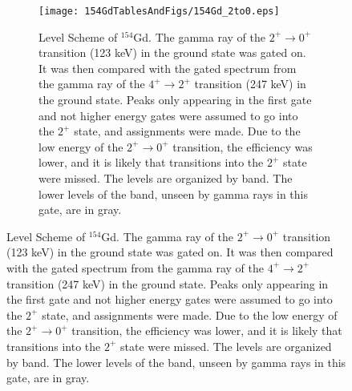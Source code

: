 \begin{landscape}
\begin{figure}[!]
    \centering
    \begin{subfigure}{1.4\textwidth}
    \texttt{[image: 154GdTablesAndFigs/154Gd\_2to0.eps]}
    \caption{\label{fig:154_2to0level}Level Scheme of $^{154}$Gd. The gamma ray of the $2^+\rightarrow0^+$ transition (123 keV) in the ground state was gated on. It was then compared with the gated spectrum from the gamma ray of the $4^+\rightarrow2^+$ transition (247 keV) in the ground state. Peaks only appearing in the first gate and not higher energy gates were assumed to go into the $2^+$ state, and assignments were made. Due to the low energy of the $2^+\rightarrow0^+$ transition, the efficiency was lower, and it is likely that transitions into the $2^+$ state were missed. The levels are organized by band. The lower levels of the band, unseen by gamma rays in this gate, are in gray.}
    \end{subfigure}
    \label{fig:154_2to0}
    \end{figure}
    \end{landscape}

